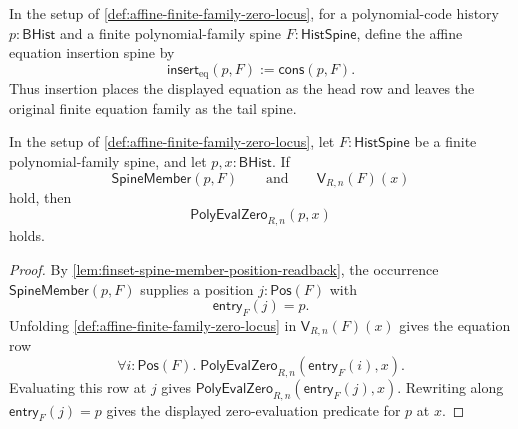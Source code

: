 \begin{definition}
\label{def:affine-equation-head-insertion}
In the setup of \autoref{def:affine-finite-family-zero-locus}, for a polynomial-code history $p:\mathsf{BHist}$ and a finite polynomial-family spine $F:\mathsf{HistSpine}$, define the affine equation insertion spine by
$$
\mathsf{insert}_{\mathrm{eq}}(p,F):=\mathsf{cons}(p,F).
$$
Thus insertion places the displayed equation as the head row and leaves the original finite equation family as the tail spine.
\end{definition}

\begin{lemma}
\label{lem:affine-zero-locus-occurred-equation-row}
In the setup of \autoref{def:affine-finite-family-zero-locus}, let $F:\mathsf{HistSpine}$ be a finite polynomial-family spine, and let $p,x:\mathsf{BHist}$. If
$$
\mathsf{SpineMember}(p,F)
\qquad\text{and}\qquad
\mathsf{V}_{R,n}(F)(x)
$$
hold, then
$$
\mathsf{PolyEvalZero}_{R,n}(p,x)
$$
holds.
\end{lemma}
\begin{proof}
By \autoref{lem:finset-spine-member-position-readback}, the occurrence $\mathsf{SpineMember}(p,F)$ supplies a position $j:\mathsf{Pos}(F)$ with
$$
\mathsf{entry}_{F}(j)=p.
$$
Unfolding \autoref{def:affine-finite-family-zero-locus} in $\mathsf{V}_{R,n}(F)(x)$ gives the equation row
$$
\forall i:\mathsf{Pos}(F).\;
\mathsf{PolyEvalZero}_{R,n}(\mathsf{entry}_{F}(i),x).
$$
Evaluating this row at $j$ gives $\mathsf{PolyEvalZero}_{R,n}(\mathsf{entry}_{F}(j),x)$. Rewriting along $\mathsf{entry}_{F}(j)=p$ gives the displayed zero-evaluation predicate for $p$ at $x$.
\end{proof}

